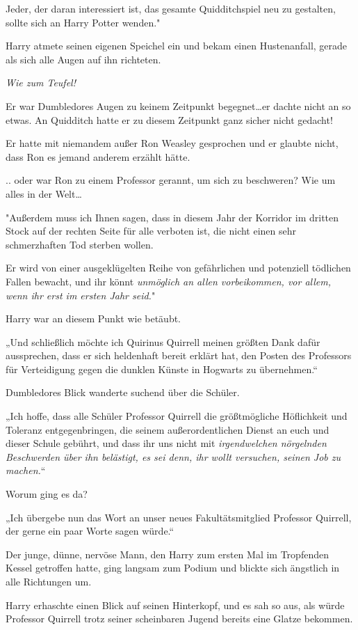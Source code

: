 {Jeder, der daran interessiert ist, das gesamte Quidditchspiel neu zu gestalten, sollte sich an Harry Potter wenden."

Harry atmete seinen eigenen Speichel ein und bekam einen Hustenanfall, gerade als sich alle Augen auf ihn richteten.

\emph{Wie zum Teufel!}

Er war Dumbledores Augen zu keinem Zeitpunkt begegnet…er dachte nicht an so etwas. An Quidditch hatte er zu diesem Zeitpunkt ganz sicher nicht gedacht!

Er hatte mit niemandem außer Ron Weasley gesprochen und er glaubte nicht, dass Ron es jemand anderem erzählt hätte.

.. oder war Ron zu einem Professor gerannt, um sich zu beschweren? Wie um alles in der Welt…

"Außerdem muss ich Ihnen sagen, dass in diesem Jahr der Korridor im dritten Stock auf der rechten Seite für alle verboten ist, die nicht einen sehr schmerzhaften Tod sterben wollen.

Er wird von einer ausgeklügelten Reihe von gefährlichen und potenziell tödlichen Fallen bewacht, und ihr könnt \emph{unmöglich an allen vorbeikommen, vor allem, wenn ihr erst im ersten Jahr seid.}"

Harry war an diesem Punkt wie betäubt.

„Und schließlich möchte ich Quirinus Quirrell meinen größten Dank dafür aussprechen, dass er sich heldenhaft bereit erklärt hat, den Posten des Professors für Verteidigung gegen die dunklen Künste in Hogwarts zu übernehmen.“

Dumbledores Blick wanderte suchend über die Schüler.

„Ich hoffe, dass alle Schüler Professor Quirrell die größtmögliche Höflichkeit und Toleranz entgegenbringen, die seinem außerordentlichen Dienst an euch und dieser Schule gebührt, und dass ihr uns nicht mit \emph{irgendwelchen nörgelnden Beschwerden über ihn belästigt, es sei denn, ihr wollt versuchen, seinen Job zu machen.}“

Worum ging es da?

„Ich übergebe nun das Wort an unser neues Fakultätsmitglied Professor Quirrell, der gerne ein paar Worte sagen würde.“

Der junge, dünne, nervöse Mann, den Harry zum ersten Mal im Tropfenden Kessel getroffen hatte, ging langsam zum Podium und blickte sich ängstlich in alle Richtungen um.

Harry erhaschte einen Blick auf seinen Hinterkopf, und es sah so aus, als würde Professor Quirrell trotz seiner scheinbaren Jugend bereits eine Glatze bekommen.

}
